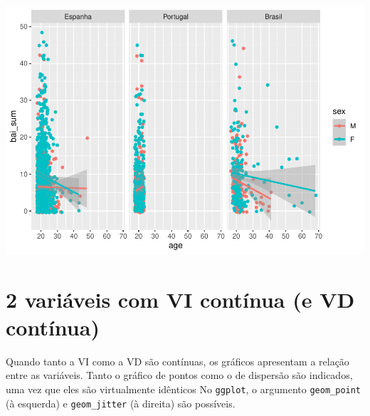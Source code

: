 \documentclass[
]{book}
\newenvironment{Shaded}{\begin{snugshade}}{\end{snugshade}}
\newcommand{\CommentTok}[1]{\textcolor[rgb]{0.56,0.35,0.01}{\textit{#1}}}
\newcommand{\DataTypeTok}[1]{\textcolor[rgb]{0.13,0.29,0.53}{#1}}
\newcommand{\DecValTok}[1]{\textcolor[rgb]{0.00,0.00,0.81}{#1}}
\newcommand{\KeywordTok}[1]{\textcolor[rgb]{0.13,0.29,0.53}{\textbf{#1}}}
\newcommand{\NormalTok}[1]{#1}
\newcommand{\OperatorTok}[1]{\textcolor[rgb]{0.81,0.36,0.00}{\textbf{#1}}}
\newcommand{\StringTok}[1]{\textcolor[rgb]{0.31,0.60,0.02}{#1}}
\begin{document}
\begin{center}\includegraphics{gitbook-demo_files/figure-latex/unnamed-chunk-28-1} \end{center}

\hypertarget{variuxe1veis-com-vi-contuxednua-e-vd-contuxednua}{%
\section{2 variáveis com VI contínua (e VD contínua)}\label{variuxe1veis-com-vi-contuxednua-e-vd-contuxednua}}

Quando tanto a VI como a VD são contínuas, os gráficos apresentam a relação entre as variáveis. Tanto o gráfico de pontos como o de dispersão são indicados, uma vez que eles são virtualmente idênticos No \texttt{ggplot}, o argumento \texttt{geom\_point} (à esquerda) e \texttt{geom\_jitter} (à direita) são possíveis.

\begin{Shaded}
\end{Shaded}
\end{document}
